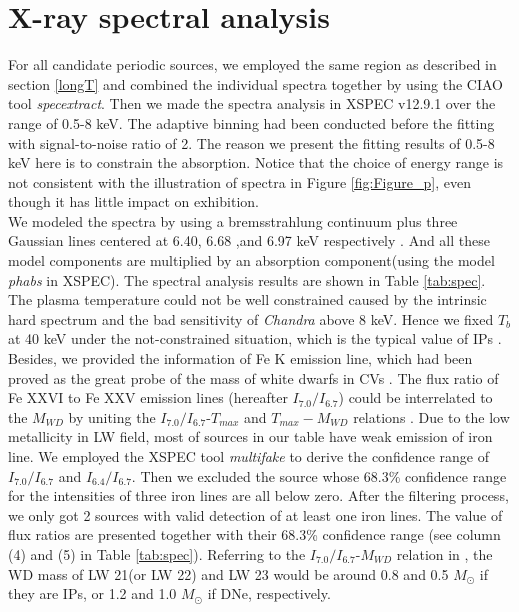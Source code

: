 \documentclass[twoside,twocolumn]{aastex63}
\begin{document}
\section{X-ray spectral analysis}\label{sec:spectra}
For all candidate periodic sources, we employed the same region as described in section \ref{longT} and combined the individual spectra together by using the CIAO tool \emph {specextract}. Then we made the spectra analysis in XSPEC v12.9.1 over the range of 0.5-8 keV. The adaptive binning had been conducted before the fitting with signal-to-noise ratio of 2. The reason we present the fitting results of 0.5-8 keV here is to constrain the absorption. Notice that the choice of energy range is not consistent with the illustration of spectra in Figure \ref{fig:Figure_p}, even though it has little impact on exhibition. 
\\
\indent
We modeled the spectra by using a bremsstrahlung continuum plus three Gaussian lines centered at 6.40, 6.68 ,and 6.97 keV respectively  \citep{2018ApJS..235...26Z,2019ApJ...882..164X}. And all these model components are multiplied by an absorption component(using the model \emph {phabs} in XSPEC). The spectral analysis results are shown in Table \ref{tab:spec}.
\\
\indent
The plasma temperature could not be well constrained caused by the intrinsic hard spectrum and the bad sensitivity of \emph{Chandra} above 8 keV. Hence we fixed $T_b$ at 40 keV under the not-constrained situation, which is the typical value of IPs \citep{2016ApJ...826..160H}.
Besides, we provided the information of Fe K emission line, which had been proved as the great probe of the mass of white dwarfs in CVs \citep{2016ApJ...818..136X}. The flux ratio of Fe XXVI to Fe XXV emission lines (hereafter $I_{7.0}/I_{6.7}$) could be interrelated to the $M_{WD}$ by uniting the $I_{7.0}/I_{6.7}$-$T_{max}$ and $T_{max}-M_{WD}$ relations \citep{2019ApJ...882..164X}. Due to the low metallicity in LW field, most of sources in our table have weak emission of iron line. We employed the XSPEC tool \emph{multifake} to derive the confidence range of $I_{7.0}/I_{6.7}$ and $I_{6.4}/I_{6.7}$. Then we excluded the source whose 68.3\% confidence range for the intensities of three iron lines are all below zero. After the filtering process, we only got 2 sources with valid detection of at least one iron lines. The value of flux ratios are presented together with their 68.3\% confidence range (see column (4) and (5) in Table \ref{tab:spec}). Referring to the $I_{7.0}/I_{6.7}$-$M_{WD}$ relation in \citet{2019ApJ...882..164X}, the WD mass of LW 21(or LW 22) and LW 23 would be around 0.8 and 0.5 $M_\odot$ if they are IPs, or 1.2 and 1.0 $M_\odot$ if DNe, respectively.
\end{document}
